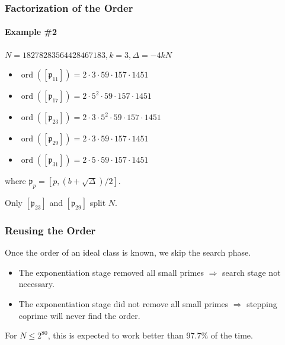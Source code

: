 \documentclass{beamer}
\DeclareMathOperator{\ord}{ord}
\newcommand{\ideal}{\mathfrak}
\newcommand{\idealclass}[1]{\left[ \ideal #1 \right]}
\begin{document}
\begin{frame}
\frametitle{Factorization of the Order}
\framesubtitle{Example \#2}

$N = 18278283564428467183, k = 3, \Delta = -4kN$
\begin{itemize}
\item $\ord(\idealclass{p_{11}}) = 2 \cdot 3 \cdot 59 \cdot 157 \cdot 1451$
\item $\ord(\idealclass{p_{17}}) = 2 \cdot 5^2 \cdot 59 \cdot 157 \cdot 1451$
\item $\ord(\idealclass{p_{23}}) = 2 \cdot 3 \cdot 5^2 \cdot 59 \cdot 157 \cdot 1451$
\item $\ord(\idealclass{p_{29}}) = 2 \cdot 3 \cdot 59 \cdot 157 \cdot 1451$
\item $\ord(\idealclass{p_{31}}) = 2 \cdot 5 \cdot 59 \cdot 157 \cdot 1451$
\end{itemize}

where $\ideal p_p = [p, (b + \sqrt\Delta)/2]$.

\bigskip
Only $\idealclass{p_{23}}$ and $\idealclass{p_{29}}$ split $N$.

\end{frame}

\begin{frame}
\frametitle{Reusing the Order}
Once the order of an ideal class is known, we skip the search phase.
\begin{itemize}
\item The exponentiation stage removed all small primes $\Rightarrow$ search stage not necessary.
\item The exponentiation stage did not remove all small primes $\Rightarrow$ stepping coprime will never find the order.
\end{itemize}
For $N \le 2^{80}$, this is expected to work better than 97.7\% of the time.
\end{frame}
\end{document}
